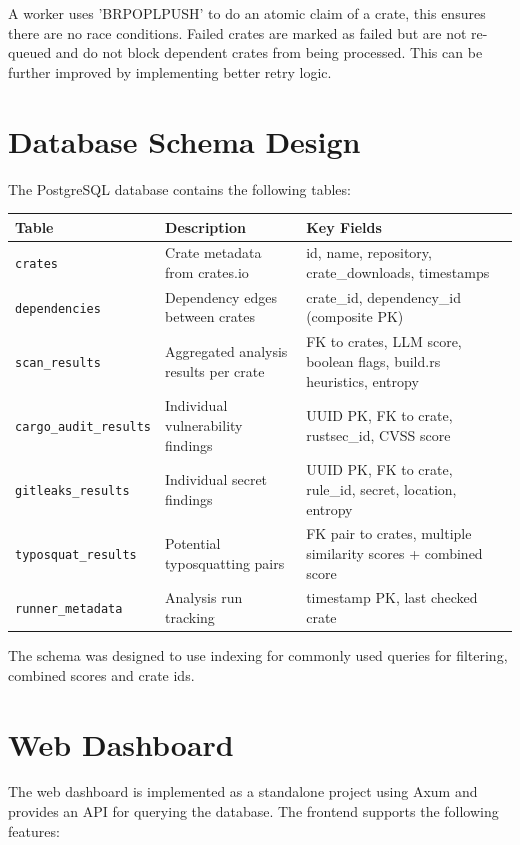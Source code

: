 A worker uses 'BRPOPLPUSH' to do an atomic claim of a crate, this ensures there are no race conditions. Failed crates are marked as failed but are not re-queued and do not block dependent crates from being processed. This can be further improved by implementing better retry logic.

\section{Database Schema Design}\label{sect:db-schema}

The PostgreSQL database contains the following tables:

\begin{tabularx}{\textwidth}{|l|l|X|}
\hline
\textbf{Table} & \textbf{Description} & \textbf{Key Fields} \\
\hline
\texttt{crates} & Crate metadata from crates.io & id, name, repository, crate\_downloads, timestamps \\
\hline
\texttt{dependencies} & Dependency edges between crates & crate\_id, dependency\_id (composite PK) \\
\hline
\texttt{scan\_results} & Aggregated analysis results per crate & FK to crates, LLM score, boolean flags, build.rs heuristics, entropy \\
\hline
\texttt{cargo\_audit\_results} & Individual vulnerability findings & UUID PK, FK to crate, rustsec\_id, CVSS score \\
\hline
\texttt{gitleaks\_results} & Individual secret findings & UUID PK, FK to crate, rule\_id, secret, location, entropy \\
\hline
\texttt{typosquat\_results} & Potential typosquatting pairs & FK pair to crates, multiple similarity scores + combined score \\
\hline
\texttt{runner\_metadata} & Analysis run tracking & timestamp PK, last checked crate \\
\hline
\end{tabularx}

The schema was designed to use indexing for commonly used queries for filtering, combined scores and crate ids.

\section{Web Dashboard}\label{sect:web-dashboard}

The web dashboard is implemented as a standalone project using Axum and provides an API for querying the database.
The frontend supports the following features:

